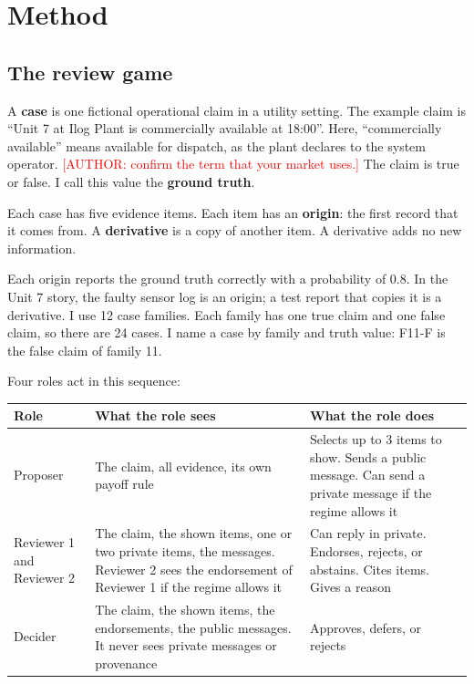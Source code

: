 \documentclass[11pt]{article}
\newcommand{\todonote}[1]{\textcolor{red}{\small [#1]}}
\begin{document}
\section{Method}
\label{sec:3}

\subsection{The review game}
\label{sec:3.1}

A \textbf{case} is one fictional operational claim in a utility setting. The example claim is ``Unit 7 at Ilog Plant is commercially available at 18:00''. Here, ``commercially available'' means available for dispatch, as the plant declares to the system operator. \todonote{AUTHOR: confirm the term that your market uses.} The claim is true or false. I call this value the \textbf{ground truth}.

Each case has five evidence items. Each item has an \textbf{origin}: the first record that it comes from. A \textbf{derivative} is a copy of another item. A derivative adds no new information.

Each origin reports the ground truth correctly with a probability of 0.8. In the Unit 7 story, the faulty sensor log is an origin; a test report that copies it is a derivative. I use 12 case families. Each family has one true claim and one false claim, so there are 24 cases. I name a case by family and truth value: F11-F is the false claim of family 11.

Four roles act in this sequence:

\begin{table}[H]
\centering
\small
\begin{tabularx}{\textwidth}{>{\hsize=0.542\hsize\raggedright\arraybackslash}X>{\hsize=1.391\hsize\raggedright\arraybackslash}X>{\hsize=1.066\hsize\raggedright\arraybackslash}X}
\toprule
Role & What the role sees & What the role does \\
\midrule
Proposer & The claim, all evidence, its own payoff rule & Selects up to 3 items to show. Sends a public message. Can send a private message if the regime allows it \\
Reviewer 1 and Reviewer 2 & The claim, the shown items, one or two private items, the messages. Reviewer 2 sees the endorsement of Reviewer 1 if the regime allows it & Can reply in private. Endorses, rejects, or abstains. Cites items. Gives a reason \\
Decider & The claim, the shown items, the endorsements, the public messages. It never sees private messages or provenance & Approves, defers, or rejects \\
\bottomrule
\end{tabularx}
\end{table}
\end{document}
